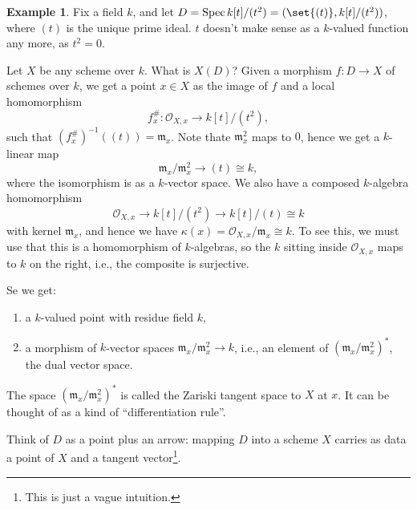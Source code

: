 \documentclass[a4paper]{amsbook}
\theoremstyle{definition}
\newtheorem*{example*}{Example}
\DeclareMathOperator\Spec{Spec}
\begin{document}
\begin{example*}
\label{AnotherExample}
Fix a field $k$, and let $D = \Spec k[t]/(t^2) = (\set{(t)}, k[t]/(t^2))$, where $(t)$ is
the unique prime ideal.
$t$ doesn't make sense as a $k$-valued function any more, as $t^2 = 0$.

Let $X$ be any scheme over $k$. What is $X(D)$? Given a morphism $f\colon D\to X$
of schemes over $k$, we get a point $x \in X$ as the image of $f$ and a local
homomorphism
\[ f^\#_x\colon \mathcal{O}_{X, x}\to k[t]/(t^2), \]
such that $(f^\#_x)^{-1}((t)) = \mathfrak{m}_x$. Note thate $\mathfrak{m}_x^2$ maps
to $0$, hence we get a $k$-linear map
\[ \mathfrak{m}_x/\mathfrak{m}_x^2 \to (t)\cong k, \]
where the isomorphism is as a $k$-vector space. We also have a composed $k$-algebra
homomorphism
\[ \mathcal{O}_{X, x} \to k[t]/(t^2)\to k[t]/(t) \cong k \]
with kernel $\mathfrak{m}_x$, and hence we have $\kappa(x) = \mathcal{O}_{X, x}/\mathfrak{m}_x \cong k$.
To see this, we must use that this is a homomorphism of $k$-algebras, so the $k$ sitting inside
$\mathcal{O}_{X, x}$ maps to $k$ on the right, i.e., the composite is surjective.

Se we get:
\begin{enumerate}
	\item a $k$-valued point with residue field $k$,
	\item a morphism of $k$-vector spaces $\mathfrak{m}_x/\mathfrak{m}_x^2\to k$,
		i.e., an element of $(\mathfrak{m}_x/\mathfrak{m}_x^2)^*$, the dual vector space.
\end{enumerate}

The space $(\mathfrak{m}_x/\mathfrak{m}_x^2)^*$ is called the Zariski tangent space
to $X$ at $x$. It can be thought of as a kind of \enquote{differentiation rule}.

Think of $D$ as a point plus an arrow: mapping $D$ into a scheme $X$ carries as
data a point of $X$ and a tangent vector\footnote{This is just a vague intuition.}.
\end{example*}
\end{document}
